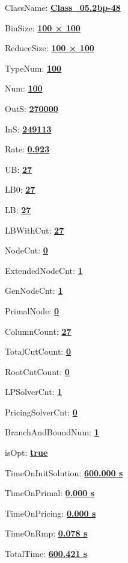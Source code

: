 \documentclass[11pt]{article}
\begin{document}
\pagestyle{empty}


ClassName: \underline{\textbf{Class_05.2bp-48}}
\par
BinSize: \underline{\textbf{100 × 100}}
\par
ReduceSize: \underline{\textbf{100 × 100}}
\par
TypeNum: \underline{\textbf{100}}
\par
Num: \underline{\textbf{100}}
\par
OutS: \underline{\textbf{270000}}
\par
InS: \underline{\textbf{249113}}
\par
Rate: \underline{\textbf{0.923}}
\par
UB: \underline{\textbf{27}}
\par
LB0: \underline{\textbf{27}}
\par
LB: \underline{\textbf{27}}
\par
LBWithCut: \underline{\textbf{27}}
\par
NodeCut: \underline{\textbf{0}}
\par
ExtendedNodeCnt: \underline{\textbf{1}}
\par
GenNodeCnt: \underline{\textbf{1}}
\par
PrimalNode: \underline{\textbf{0}}
\par
ColumnCount: \underline{\textbf{27}}
\par
TotalCutCount: \underline{\textbf{0}}
\par
RootCutCount: \underline{\textbf{0}}
\par
LPSolverCnt: \underline{\textbf{1}}
\par
PricingSolverCnt: \underline{\textbf{0}}
\par
BranchAndBoundNum: \underline{\textbf{1}}
\par
isOpt: \underline{\textbf{true}}
\par
TimeOnInitSolution: \underline{\textbf{600.000 s}}
\par
TimeOnPrimal: \underline{\textbf{0.000 s}}
\par
TimeOnPricing: \underline{\textbf{0.000 s}}
\par
TimeOnRmp: \underline{\textbf{0.078 s}}
\par
TotalTime: \underline{\textbf{600.421 s}}
\par
\newpage


\end{document}
